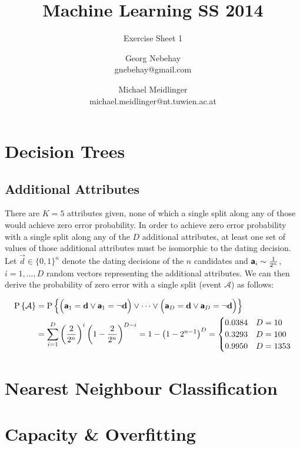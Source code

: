 \documentclass{scrartcl}
\title{Machine Learning SS 2014}
\subtitle{Exercise Sheet 1}
\author{Georg Nebehay\\gnebehay@gmail.com
\and
Michael Meidlinger\\
michael.meidlinger@nt.tuwien.ac.at
}
\date{}
\begin{document}
\maketitle

\section{Decision Trees}



\subsection{Additional Attributes}
There are $K=5$ attributes given, none of which a single split along any of those would achieve zero error probability. In order to achieve zero error probability with a single split along any of the $D$ additional attributes, at least one set of values of those additional attributes must be isomorphic to the dating decision. Let $\vec d \in \lbrace 0,1\rbrace^n$ denote the dating decisions of the $n$ candidates and ${\textbf{\textsf{a}}}_i \sim \frac{1}{2^n}$, $i=1,\dots,D$  random vectors representing the additional attributes. We can then derive the probability of zero error with a single split (event $\mathcal A$) as follows:

\begin{align}
	\Prob{\mathcal A}& = 
	\Prob{ \Big(\rvec a_1 = \vec d \vee \rvec a_1 = \neg \vec d \Big) \vee 
		\dots \vee \Big(\rvec a_D = \vec d \vee \rvec a_D = \neg \vec d \Big)} \\
	&= \sum_{i=1}^{D}  \left( \frac{2}{2^n} \right)^i  \left( 1-\frac{2}{2^n}\right)^{D-i} 
	= 1- \left( 1-2^{n-1} \right)^{D} 
	= \begin{cases} 0.0384 &D=10 \\  0.3293 &D=100 \\ 0.9950 &D=1353\end{cases}
\end{align}

\section{Nearest Neighbour Classification}


\section{Capacity \& Overfitting}
\end{document}
